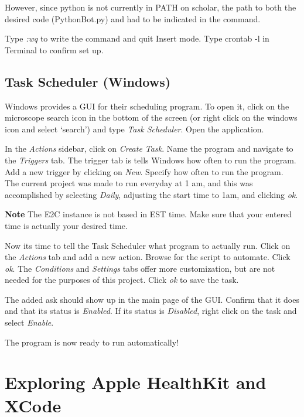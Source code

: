 \documentclass[]{book}
\begin{document}
However, since python is not currently in PATH on scholar, the path to both the desired code (PythonBot.py) and had to be indicated in the command.

Type \emph{:wq} to write the command and quit Insert mode. Type crontab -l in Terminal to confirm set up.

\hypertarget{task-scheduler-windows}{%
\subsection{Task Scheduler (Windows)}\label{task-scheduler-windows}}

Windows provides a GUI for their scheduling program. To open it, click on the microscope search icon in the bottom of the screen (or right click on the windows icon and select `search') and type \emph{Task Scheduler}. Open the application.

In the \emph{Actions} sidebar, click on \emph{Create Task}. Name the program and navigate to the \emph{Triggers} tab. The trigger tab is tells Windows how often to run the program. Add a new trigger by clicking on \emph{New}. Specify how often to run the program. The current project was made to run everyday at 1 am, and this was accomplished by selecting \emph{Daily}, adjusting the start time to 1am, and clicking \emph{ok}.

\textbf{Note} The E2C instance is not based in EST time. Make sure that your entered time is actually your desired time.

Now its time to tell the Task Scheduler what program to actually run. Click on the \emph{Actions} tab and add a new action. Browse for the script to automate. Click \emph{ok}. The \emph{Conditions} and \emph{Settings} tabs offer more customization, but are not needed for the purposes of this project. Click \emph{ok} to save the task.

The added ask should show up in the main page of the GUI. Confirm that it does and that its status is \emph{Enabled}. If its status is \emph{Disabled}, right click on the task and select \emph{Enable}.

The program is now ready to run automatically!

\hypertarget{exploring-apple-healthkit-and-xcode}{%
\section{Exploring Apple HealthKit and XCode}\label{exploring-apple-healthkit-and-xcode}}
\end{document}
